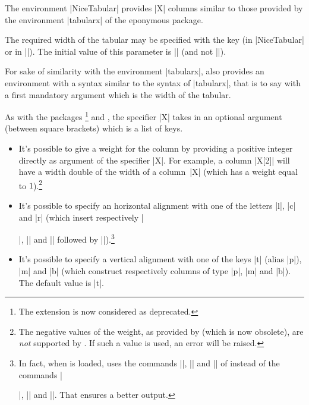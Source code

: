 \documentclass[dvipsnames]{article}%
\begin{document}
The environment |{NiceTabular}| provides |X| columns similar to those provided
by the environment |{tabularx}| of the eponymous package.

The required width of the tabular may be specified with the key
 (in |{NiceTabular}| or in |\NiceMatrixOptions|). The initial
value of this parameter is |\linewidth| (and not |\textwidth|).

For sake of similarity with the environment |{tabularx}|,  also
provides an environment  with a syntax similar to
the syntax of |{tabularx}|, that is to say with a first mandatory argument which
is the width of the tabular.

As with the packages \footnote{The extension  is now
considered as deprecated.} and , the specifier |X| takes
in an optional argument (between square brackets) which is a list of keys.
\begin{itemize}
\item It's possible to give a weight for the column by providing a positive
integer directly as argument of the specifier |X|. For example, a column
|X[2]| will have a width double of the width of a column~|X| (which has a
weight equal to $1$).\footnote{The negative values of the weight, as provided
by  (which is now obsolete), are \emph{not} supported by .
If such a value is used, an error will be raised.}
\item It's possible to specify an horizontal alignment with one of the
letters |l|, |c| and |r| (which insert respectively |\raggedright|,
|\centering| and |\raggedleft| followed by |\arraybackslash|).\footnote{In fact,
when  is loaded,  uses the commands
|\RaggedRight|, |\Centering| and |\RaggedLeft| of  instead of the
commands |\raggedright|, |\centering| and |\raggedleft|. That ensures a better output.}
\item It's possible to specify a vertical alignment with one of the keys
|t| (alias |p|), |m| and |b| (which construct respectively columns of type
|p|, |m| and |b|). The default value is |t|.
\end{itemize}

\end{document}
